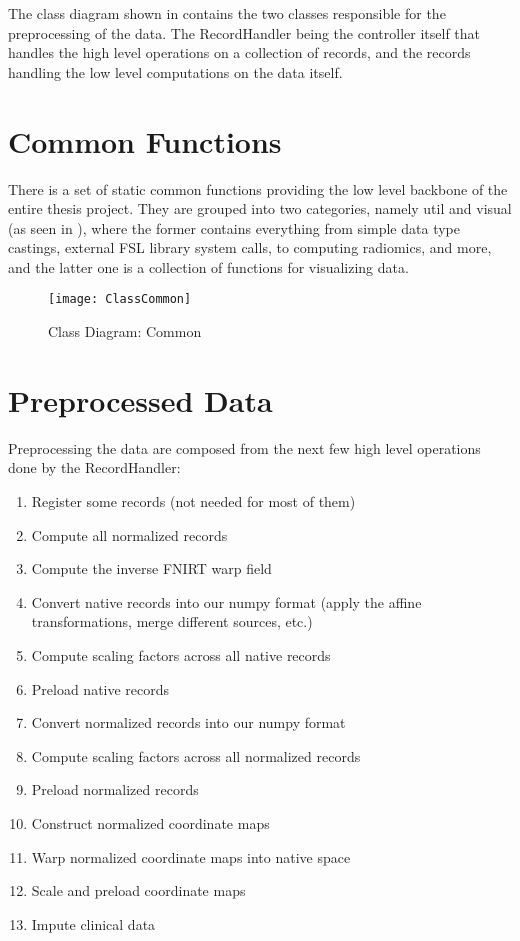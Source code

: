 The class diagram shown in  contains the two classes responsible for the preprocessing of the data. The RecordHandler being the controller itself that handles the high level operations on a collection of records, and the records handling the low level computations on the data itself.

\section{Common Functions}

There is a set of static common functions providing the low level backbone of the entire thesis project. They are grouped into two categories, namely util and visual (as seen in ), where the former contains everything from simple data type castings, external \ac{FSL} library system calls, to computing radiomics, and more, and the latter one is a collection of functions for visualizing data.

\begin{figure}[H]
\centering
\texttt{[image: ClassCommon]}
\caption{Class Diagram: Common}
\label{fig:digclscom}
\end{figure}

\section{Preprocessed Data}

Preprocessing the data are composed from the next few high level operations done by the RecordHandler:
\begin{enumerate}
  \item Register some records (not needed for most of them)
  \item Compute all normalized records
  \item Compute the inverse \ac{FNIRT} warp field
  \item Convert native records into our numpy format (apply the affine transformations, merge different sources, etc.)
  \item Compute scaling factors across all native records
  \item Preload native records
  \item Convert normalized records into our numpy format
  \item Compute scaling factors across all normalized records
  \item Preload normalized records
  \item Construct normalized coordinate maps
  \item Warp normalized coordinate maps into native space
  \item Scale and preload coordinate maps
  \item Impute clinical data
\end{enumerate}

